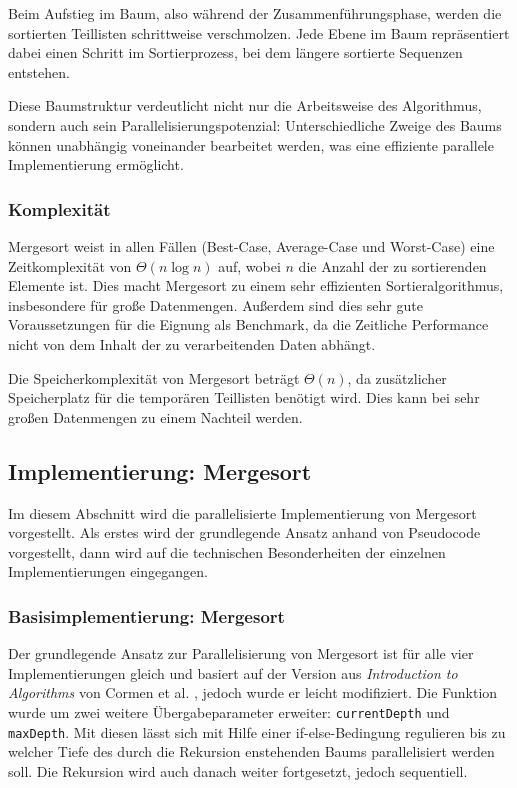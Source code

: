 \documentclass[fontsize=12pt,paper=a4,twoside=semi,parskip=half-,headsepline,headinclude]{scrreprt}
\begin{document}
Beim Aufstieg im Baum, also während der Zusammenführungsphase, werden die sortierten Teillisten schrittweise verschmolzen. Jede Ebene im Baum repräsentiert dabei einen Schritt im Sortierprozess, bei dem längere sortierte Sequenzen entstehen.

Diese Baumstruktur verdeutlicht nicht nur die Arbeitsweise des Algorithmus, sondern auch sein Parallelisierungspotenzial: Unterschiedliche Zweige des Baums können unabhängig voneinander bearbeitet werden, was eine effiziente parallele Implementierung ermöglicht.

\subsubsection{Komplexität}

Mergesort weist in allen Fällen (Best-Case, Average-Case und Worst-Case) eine Zeitkomplexität von $\Theta(n \log n)$ auf, wobei $n$ die Anzahl der zu sortierenden Elemente ist. Dies macht Mergesort zu einem sehr effizienten Sortieralgorithmus, insbesondere für große Datenmengen. Außerdem sind dies sehr gute Voraussetzungen für die Eignung als Benchmark, da die Zeitliche Performance nicht von dem Inhalt der zu verarbeitenden Daten abhängt.\cite{Cormen2022}

Die Speicherkomplexität von Mergesort beträgt $\Theta(n)$, da zusätzlicher Speicherplatz für die temporären Teillisten benötigt wird. Dies kann bei sehr großen Datenmengen zu einem Nachteil werden.


\subsection{Implementierung: Mergesort}

Im diesem Abschnitt wird die parallelisierte Implementierung von Mergesort vorgestellt. Als erstes wird der grundlegende Ansatz anhand von Pseudocode vorgestellt, dann wird auf die technischen Besonderheiten der einzelnen Implementierungen eingegangen.

\subsubsection{Basisimplementierung: Mergesort}
\label{subsubsec:implms}

Der grundlegende Ansatz zur Parallelisierung von Mergesort ist für alle vier Implementierungen gleich und basiert auf der Version aus \emph{Introduction to Algorithms} von Cormen et al. \cite[S. 775]{Cormen2022}, jedoch wurde er leicht modifiziert. Die Funktion wurde um zwei weitere Übergabeparameter erweiter: \texttt{currentDepth} und \texttt{maxDepth}. Mit diesen lässt sich mit Hilfe einer if-else-Bedingung regulieren bis zu welcher Tiefe des durch die Rekursion enstehenden Baums parallelisiert werden soll. Die Rekursion wird auch danach weiter fortgesetzt, jedoch sequentiell.
\end{document}
